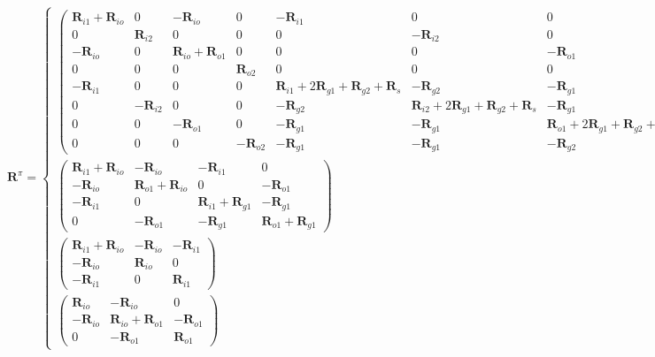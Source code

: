 \begin{equation}
\bm{R}^\pi = \left\{ \begin{array}{ll}
\left( \begin{array}{cccccccc}
\bm{R}_{i1} + \bm{R}_{io} & 0 & -\bm{R}_{io} & 0 & -\bm{R}_{i1} & 0 & 0 & 0 \\
0 & \bm{R}_{i2} & 0 & 0 & 0 & -\bm{R}_{i2} & 0 & 0 \\
-\bm{R}_{io} & 0 & \bm{R}_{io} + \bm{R}_{o1} & 0 & 0 & 0 & -\bm{R}_{o1} & 0 \\
0 & 0 & 0 & \bm{R}_{o2} & 0 & 0 & 0 & -\bm{R}_{o2} \\
-\bm{R}_{i1} & 0 & 0 & 0 & \bm{R}_{i1}+2\bm{R}_{g1}+\bm{R}_{g2}+\bm{R}_{s} & -\bm{R}_{g2} & -\bm{R}_{g1} & -\bm{R}_{g1} \\
0 & -\bm{R}_{i2} & 0 & 0 & -\bm{R}_{g2} & \bm{R}_{i2}+2\bm{R}_{g1}+\bm{R}_{g2}+\bm{R}_{s} & -\bm{R}_{g1} & -\bm{R}_{g1} \\
0 & 0 & -\bm{R}_{o1} & 0 & -\bm{R}_{g1} & -\bm{R}_{g1} & \bm{R}_{o1}+2\bm{R}_{g1}+\bm{R}_{g2}+\bm{R}_{s} & 0 \\
0 & 0 & 0 & -\bm{R}_{o2} & -\bm{R}_{g1} & -\bm{R}_{g1} & -\bm{R}_{g2} & \bm{R}_{o2}+2\bm{R}_{g1}+\bm{R}_{g2}+\bm{R}_{s} \end{array} \right)
  & \mbox{2U} \\
\left( \begin{array}{cccc}
\bm{R}_{i1}+\bm{R}_{io} & -\bm{R}_{io} & -\bm{R}_{i1} & 0  \\
-\bm{R}_{io} & \bm{R}_{o1}+\bm{R}_{io} & 0 & -\bm{R}_{o1}  \\
-\bm{R}_{i1} & 0 & \bm{R}_{i1}+\bm{R}_{g1} & -\bm{R}_{g1}  \\
0 & -\bm{R}_{o1} & -\bm{R}_{g1} & \bm{R}_{o1}+\bm{R}_{g1}  \end{array} \right)
 & \mbox{1U} \\
\left( \begin{array}{ccc}
\bm{R}_{i1}+\bm{R}_{io} & -\bm{R}_{io} & -\bm{R}_{i1}  \\
-\bm{R}_{io} & \bm{R}_{io} & 0  \\
-\bm{R}_{i1} & 0 & \bm{R}_{i1}  \end{array} \right)
 & \mbox{CXA} \\
\left( \begin{array}{ccc}
\bm{R}_{io} & -\bm{R}_{io} & 0  \\
-\bm{R}_{io} & \bm{R}_{io}+\bm{R}_{o1} & -\bm{R}_{o1}  \\
0 & -\bm{R}_{o1} & \bm{R}_{o1}  \end{array} \right)
 & \mbox{CXA} 
       \end{array} \right.
\end{equation}
